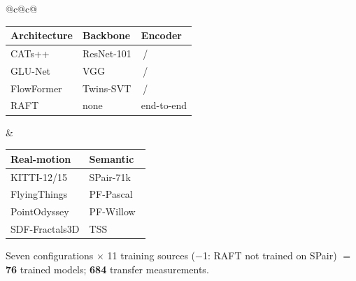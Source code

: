\centering
\setlength{\tabcolsep}{4pt}
\begin{tabular}{@{}c@{\hspace{3mm}}c@{}}
\begin{tabular}[t]{@{}lll@{}}
\toprule
Architecture & Backbone & Encoder \\
\midrule
CATs++~\cite{cho2022cats++}            & ResNet-101 & \encfrozen\,/\,\enctrained \\
GLU-Net~\cite{truong2020glunet}        & VGG        & \encfrozen\,/\,\enctrained \\
FlowFormer~\cite{huang2022flowformer}  & Twins-SVT  & \encfrozen\,/\,\enctrained \\
RAFT~\cite{teed2020raft}               & none       & end-to-end \\
\bottomrule
\end{tabular}
&
\begin{tabular}[t]{@{}ll@{}}
\toprule
Real-motion & Semantic \\
\midrule
KITTI-12/15~\cite{kitti2012,kitti2015}            & SPair-71k~\cite{spair71k} \\
FlyingThings~\cite{mayer2016FlyingThingsDataset}  & PF-Pascal~\cite{pfpascal} \\
PointOdyssey~\cite{pointodyssey}                  & PF-Willow~\cite{pfpascal} \\
SDF-Fractals3D                                    & TSS~\cite{taniai2016tss} \\
\bottomrule
\end{tabular}
\end{tabular}

\smallskip
{\footnotesize Seven configurations $\times$ 11 training sources ($-$1: RAFT not trained on SPair) $=$
\textbf{76} trained models; \textbf{684} transfer measurements.}
